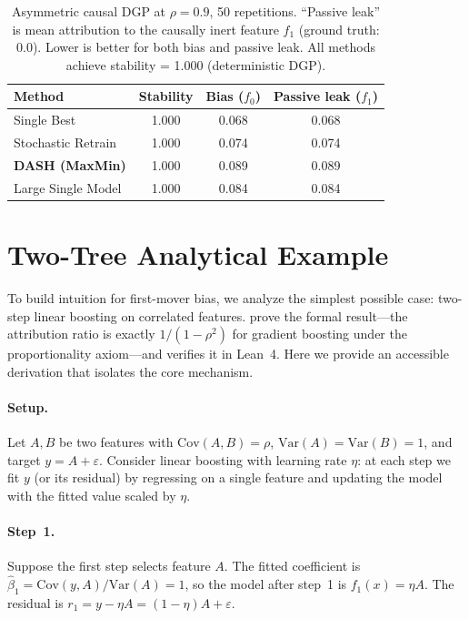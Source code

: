 \documentclass[10pt]{article}
\newcommand{\rhovar}{\rho}
\begin{document}
\begin{table}[htbp]
\centering
\caption{Asymmetric causal DGP at $\rho = 0.9$, 50 repetitions.
``Passive leak'' is mean attribution to the causally inert feature $f_1$
(ground truth: 0.0). Lower is better for both bias and passive leak.
All methods achieve stability = 1.000 (deterministic DGP).}
\label{tab:asymmetric}
\small
\begin{tabular}{lccc}
\toprule
\textbf{Method} & \textbf{Stability} & \textbf{Bias ($f_0$)} & \textbf{Passive leak ($f_1$)} \\
\midrule
Single Best & 1.000 & 0.068 & 0.068 \\
Stochastic Retrain & 1.000 & 0.074 & 0.074 \\
\textbf{DASH (MaxMin)} & 1.000 & 0.089 & 0.089 \\
Large Single Model & 1.000 & 0.084 & 0.084 \\
\bottomrule
\end{tabular}
\end{table}


\section{Two-Tree Analytical Example}
\label{app:twotree}

To build intuition for first-mover bias, we analyze the simplest possible
case: two-step linear boosting on correlated features.
\citet{caraker2026impossibility} prove the formal result---the
attribution ratio is exactly $1/(1-\rhovar^2)$ for gradient boosting
under the proportionality axiom---and verifies it in Lean~4. Here we
provide an accessible derivation that isolates the core mechanism.

\paragraph{Setup.}
Let $A, B$ be two features with $\text{Cov}(A, B) = \rho$,
$\text{Var}(A) = \text{Var}(B) = 1$, and target $y = A + \varepsilon$.
Consider linear boosting with learning rate $\eta$: at each step we
fit $y$ (or its residual) by regressing on a single feature and updating
the model with the fitted value scaled by $\eta$.

\paragraph{Step~1.}
Suppose the first step selects feature $A$.  The fitted coefficient is
$\hat{\beta}_1 = \text{Cov}(y, A)/\text{Var}(A) = 1$, so the model
after step~1 is $f_1(x) = \eta A$.  The residual is
$r_1 = y - \eta A = (1 - \eta) A + \varepsilon$.
\end{document}
